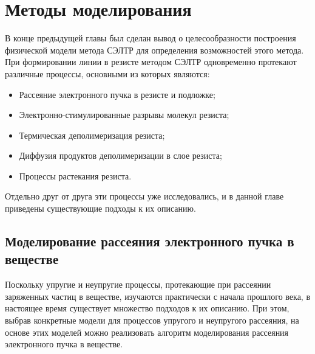 \chapter{Методы моделирования}

В конце предыдущей главы был сделан вывод о целесообразности построения физической модели метода СЭЛТР для определения возможностей этого метода. При формировании линии в резисте методом СЭЛТР одновременно протекают различные процессы, основными из которых являются:
\begin{itemize}
	\item Рассеяние электронного пучка в резисте и подложке;
	\item Электронно-стимулированные разрывы молекул резиста;
	\item Термическая деполимеризация резиста;
	\item Диффузия продуктов деполимеризации в слое резиста;
	\item Процессы растекания резиста.
\end{itemize}

Отдельно друг от друга эти процессы уже исследовались, и в данной главе приведены существующие подходы к их описанию.


\section{Моделирование рассеяния электронного пучка в веществе}
Поскольку упругие и неупругие процессы, протекающие при рассеянии заряженных частиц в веществе, изучаются практически с начала прошлого века, в настоящее время существует множество подходов к их описанию. При этом, выбрав конкретные модели для процессов упругого и неупругого рассеяния, на основе этих моделей можно реализовать алгоритм моделирования рассеяния электронного пучка в веществе.









